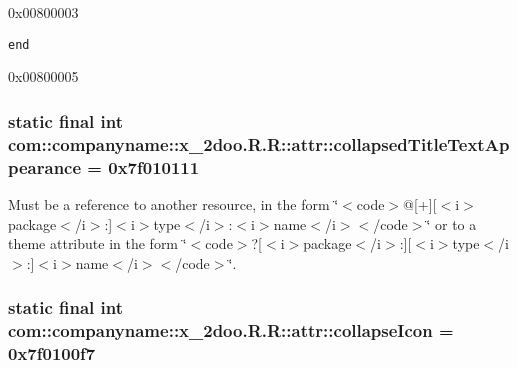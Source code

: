 0x00800003

{\tt end}

0x00800005\hypertarget{classcom_1_1companyname_1_1x__2doo_1_1_r_1_1attr_97eedc6db18d59049792e15dd8b3d512}{
\subsubsection[{collapsedTitleTextAppearance}]{\setlength{\rightskip}{0pt plus 5cm}static final int com::companyname::x\_\-2doo.R.R::attr::collapsedTitleTextAppearance = 0x7f010111}}
\label{classcom_1_1companyname_1_1x__2doo_1_1_r_1_1attr_97eedc6db18d59049792e15dd8b3d512}


Must be a reference to another resource, in the form \char`\"{}$<$code$>$@\mbox{[}+\mbox{]}\mbox{[}$<$i$>$package$<$/i$>$:\mbox{]}$<$i$>$type$<$/i$>$:$<$i$>$name$<$/i$>$$<$/code$>$\char`\"{} or to a theme attribute in the form \char`\"{}$<$code$>$?\mbox{[}$<$i$>$package$<$/i$>$:\mbox{]}\mbox{[}$<$i$>$type$<$/i$>$:\mbox{]}$<$i$>$name$<$/i$>$$<$/code$>$\char`\"{}. \hypertarget{classcom_1_1companyname_1_1x__2doo_1_1_r_1_1attr_ac9e7843fbcc98034ff18441100427e7}{
\subsubsection[{collapseIcon}]{\setlength{\rightskip}{0pt plus 5cm}static final int com::companyname::x\_\-2doo.R.R::attr::collapseIcon = 0x7f0100f7}}
\label{classcom_1_1companyname_1_1x__2doo_1_1_r_1_1attr_ac9e7843fbcc98034ff18441100427e7}


